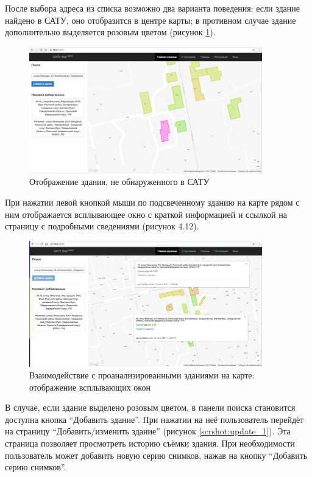 	После выбора адреса из списка возможно два варианта поведения: если здание найдено в САТУ, оно отобразится в центре карты; в противном случае здание дополнительно выделяется розовым цветом (рисунок \ref{scrshot:main_new_1}).

	\begin{figure}[h!]
		\centering
		\includegraphics[width=0.9\textwidth]{images/scrshots/main_new_1}
		\caption{Отображение здания, не обнаруженного в САТУ}
		\label{scrshot:main_new_1}
	\end{figure}

	\pagebreak

	При нажатии левой кнопкой мыши по подсвеченному зданию на карте рядом с ним отображается всплывающее окно с краткой информацией и ссылкой на страницу с подробными сведениями (рисунок 4.12).

	\begin{figure}[h!]
		\centering
		\includegraphics[width=0.9\textwidth]{images/scrshots/main_selected_1}
		\caption{Взаимодействие с проанализированными зданиями на карте: отображение всплывающих окон}
		\label{scrshot:main_selected_1}
	\end{figure}

	В случае, если здание выделено розовым цветом, в панели поиска становится доступна кнопка “Добавить здание”. При нажатии на неё пользователь перейдёт на страницу “Добавить/изменить здание” (рисунок \ref{scrshot:update_1}). Эта страница позволяет просмотреть историю съёмки здания. При необходимости пользователь может добавить новую серию снимков, нажав на кнопку “Добавить серию снимков”.

